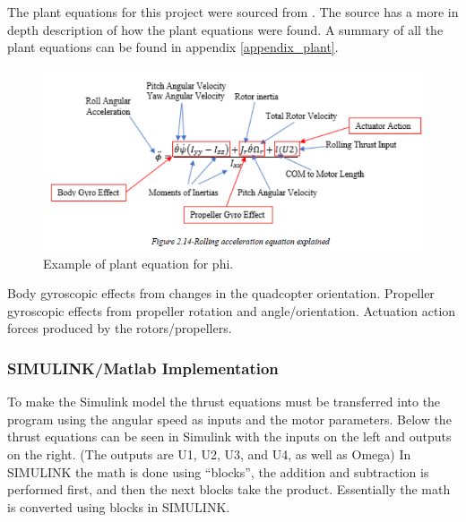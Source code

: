 The plant equations for this project were sourced from \cite{Ferry}. The source has a more in depth description of how the plant equations were found.
A summary of all the plant equations can be found in appendix \ref{appendix_plant}.

\begin{figure}[H]
   \begin{center}
      \includegraphics[scale =1]{pictures/control/plant equation example.png}
   \end{center}
   \caption{Example of plant equation for phi. \cite{Ferry}}
   \end{figure}
Body gyroscopic effects from changes in the quadcopter orientation.
Propeller gyroscopic effects from propeller rotation and angle/orientation.
Actuation action forces produced by the rotors/propellers.

\subsubsection{SIMULINK/Matlab Implementation}
To make the Simulink model the thrust equations must be transferred into the program using the angular speed as inputs and the motor parameters. Below the thrust equations can be seen in Simulink with the inputs on the left and outputs on the right. (The outputs are U1, U2, U3, and U4, as well as Omega) In SIMULINK the math is done using “blocks”, the addition and subtraction is performed first, and then the next blocks take the product. Essentially the math is converted using blocks in SIMULINK.

